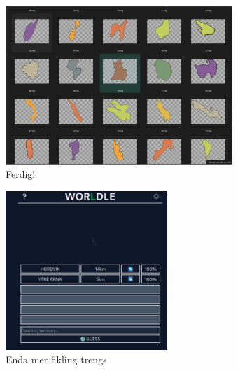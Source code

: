 \begin{frame}
    \begin{figure}
        \centering
        \includegraphics[height = 6cm]{images/svg_finished.jpg}%
        \caption{Ferdig!}
    \end{figure}
\end{frame}

\begin{frame}
    \begin{figure}
        \centering
        \includegraphics[height = 6cm]{images/svg_toosmall.png}%
        \caption{Enda mer fikling trengs}
    \end{figure}
\end{frame}